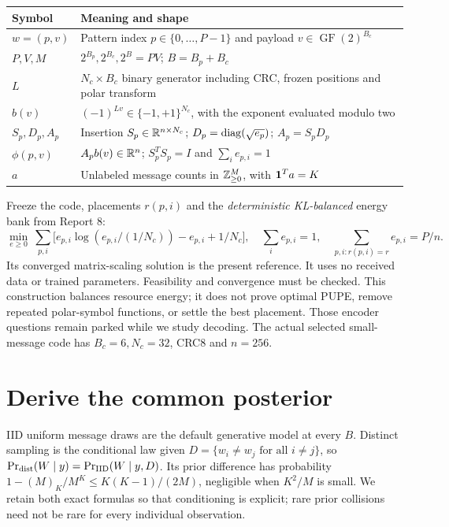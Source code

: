 \documentclass[10pt,a4paper]{article}
\newcommand{\GF}{\operatorname{GF}}
\begin{document}
\begin{center}
\begin{tabularx}{\textwidth}{@{}lY@{}}\toprule
Symbol & Meaning and shape\\\midrule
$w=(p,v)$ & Pattern index $p\in\{0,\ldots,P-1\}$ and payload $v\in\GF(2)^{B_c}$\\
$P,V,M$ & $2^{B_p},2^{B_c},2^B=PV$; $B=B_p+B_c$\\
$L$ & $N_c\times B_c$ binary generator including CRC, frozen positions and polar transform\\
$b(v)$ & $(-1)^{Lv}\in\{-1,+1\}^{N_c}$, with the exponent evaluated modulo two\\
$S_p,D_p,A_p$ & Insertion $S_p\in\mathbb{R}^{n\times N_c}$; $D_p=\operatorname{diag}(\sqrt{e_p})$; $A_p=S_pD_p$\\
$\phi(p,v)$ & $A_pb(v)\in\mathbb{R}^n$; $S_p^TS_p=I$ and $\sum_i e_{p,i}=1$\\
$a$ & Unlabeled message counts in $\mathbb{Z}_{\geq0}^{M}$, with $\mathbf{1}^Ta=K$\\\bottomrule
\end{tabularx}
\end{center}

Freeze the code, placements $r(p,i)$ and the \emph{deterministic KL-balanced} energy bank from Report 8:
\[
 \min_{e\geq0}\ \sum_{p,i}\big[e_{p,i}\log(e_{p,i}/(1/N_c))-e_{p,i}+1/N_c\big],
 \quad \sum_i e_{p,i}=1,\quad \sum_{p,i:r(p,i)=r}e_{p,i}=P/n.
\]
Its converged matrix-scaling solution is the present reference. It uses no received data or trained parameters.
Feasibility and convergence must be checked. This construction balances resource energy; it does not prove optimal
PUPE, remove repeated polar-symbol functions, or settle the best placement. Those encoder questions remain parked
while we study decoding. The actual selected small-message code has $B_c=6,N_c=32$, CRC8 and $n=256$.

\clearpage
\section{Derive the common posterior}
IID uniform message draws are the default generative model at every $B$. Distinct sampling is the conditional
law given $D=\{w_i\ne w_j\text{ for all }i\ne j\}$, so
$\Pr_{\rm dist}(W\mid y)=\Pr_{\rm IID}(W\mid y,D)$.
Its prior difference has probability $1-(M)_K/M^K\leq K(K-1)/(2M)$, negligible when $K^2/M$ is small.
We retain both exact formulas so that conditioning is explicit; rare prior collisions need not be rare for every
individual observation.
\end{document}
